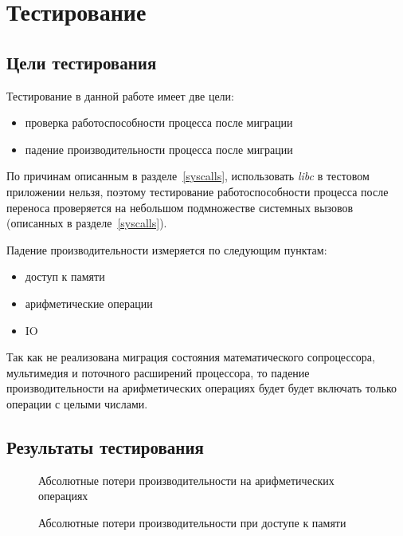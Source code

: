 \chapter{Тестирование}

\section{Цели тестирования}

Тестирование в данной работе имеет две цели:

\begin{itemize}

    \item проверка работоспособности процесса после миграции
    \item падение производительности процесса после миграции

\end{itemize}

По причинам описанным в разделе~\ref{syscalls}, использовать \textit{libc} в тестовом приложении нельзя, поэтому тестирование работоспособности процесса после переноса проверяется на небольшом подмножестве системных вызовов (описанных в разделе~\ref{syscalls}).

Падение производительности измеряется по следующим пунктам:

\begin{itemize}
    \item доступ к памяти
    \item арифметические операции
    \item IO
\end{itemize}

Так как не реализована миграция состояния математического сопроцессора, мультимедия и поточного расширений процессора, то падение производительности на арифметических операциях будет будет включать только операции с целыми числами.

\section{Результаты тестирования}\label{results}

\begin{figure}[h]
\caption{Абсолютные потери производительности на арифметических операциях}
\label{pic:performance_div}
\end{figure}

\begin{figure}[h]
\caption{Абсолютные потери производительности при доступе к памяти}
\label{pic:performance_mem}
\end{figure}

